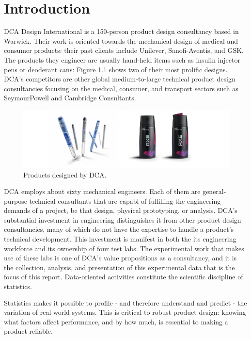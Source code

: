 \documentclass[11pt,a4paper,article]{memoir} %
\begin{document}
\newpage
\chapter{Introduction}
DCA Design International is a 150-person product design consultancy based in Warwick. Their work is oriented towards the mechanical design of medical and consumer products: their past clients include Unilever, Sanofi-Aventis, and GSK. The products they engineer are usually hand-held items such as insulin injector pens or deoderant cans: Figure \ref{fig:dca_profile} shows two of their most prolific designs. DCA's competitors are other global medium-to-large technical product design consultancies focusing on the medical, consumer, and transport sectors such as SeymourPowell and Cambridge Consultants.
\par
\begin{figure}[b]
\includegraphics[width=\textwidth]{DCA_profile.pdf}
\caption{Products designed by DCA.}
\label{fig:dca_profile}
\end{figure}
\par
DCA employs about sixty mechanical engineers. Each of them are general-purpose technical consultants that are capabl of fulfilling the engineering demands of a project, be that design, physical prototyping, or analysis. DCA's substantial investment in engineering distinguishes it from other product design consultancies, many of which do not have the expertise to handle a product's technical development. This investment is manifest in both the its engineering workforce and its ownership of four test labs. The experimental work that makes use of these labs is one of DCA's value propositions as a consultancy, and it is the collection, analysis, and presentation of this experimental data that is the focus of this report. Data-oriented activities constitute the scientific discipline of statistics.
\par
Statistics makes it possible to profile - and therefore understand and predict - the variation of real-world systems. This is critical to robust product design: knowing what factors affect performance, and by how much, is essential to making a product reliable.
\end{document}

